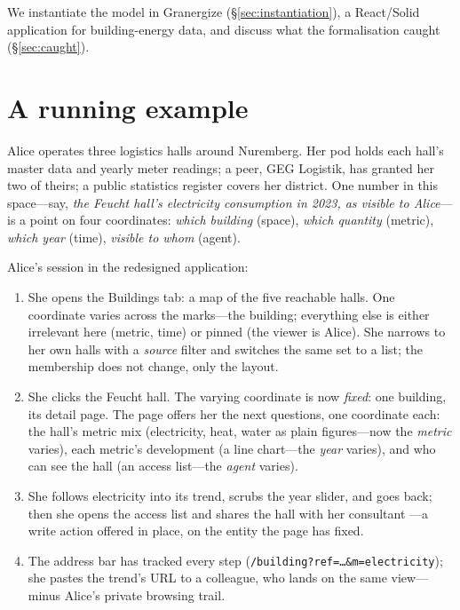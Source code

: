 \documentclass[11pt,a4paper]{article}
\theoremstyle{remark}
\begin{document}
We instantiate the model in Granergize (\S\ref{sec:instantiation}), a React/Solid
application for building-energy data, and discuss what the formalisation caught
(\S\ref{sec:caught}).

\section{A running example}\label{sec:running}

Alice operates three logistics halls around Nuremberg. Her pod holds each hall's
master data and yearly meter readings; a peer, GEG Logistik, has granted her two
of theirs; a public statistics register covers her district. One number in this
space---say, \emph{the Feucht hall's electricity consumption in 2023, as visible
to Alice}---is a point on four coordinates: \emph{which building} (space),
\emph{which quantity} (metric), \emph{which year} (time), \emph{visible to whom}
(agent).

Alice's session in the redesigned application:

\begin{enumerate}
\item She opens the \textsf{Buildings} tab: a map of the five reachable halls.
  One coordinate varies across the marks---the building; everything else is
  either irrelevant here (metric, time) or pinned (the viewer is Alice). She
  narrows to her own halls with a \emph{source} filter and switches the same set
  to a list; the membership does not change, only the layout.
\item She clicks the Feucht hall. The varying coordinate is now \emph{fixed}: one
  building, its detail page. The page offers her the next questions, one
  coordinate each: the hall's metric mix (electricity, heat, water as plain
  figures---now the \emph{metric} varies), each metric's development (a line
  chart---the \emph{year} varies), and who can see the hall (an access
  list---the \emph{agent} varies).
\item She follows electricity into its trend, scrubs the year slider, and goes
  back; then she opens the access list and shares the hall with her consultant
  ---a write action offered in place, on the entity the page has fixed.
\item The address bar has tracked every step
  (\texttt{/building?ref=\ldots\&m=electricity}); she pastes the trend's URL to a
  colleague, who lands on the same view---minus Alice's private browsing trail.
\end{enumerate}
\end{document}
